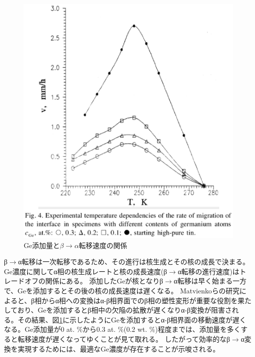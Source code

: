 \begin{figure}[!h]
\begin{minipage}{0.6\hsize}
\begin{center}
   \includegraphics[width=\hsize]{Introduction/Ge_content.eps}
  \end{center}
  \caption{Ge添加量と$\beta \to \alpha$転移速度の関係\cite{Matvienko}}
  \label{fig:Ge_content}
   \end{minipage}
\end{figure}
\clearpage

β$\to$α転移は一次転移であるため、その進行は核生成とその核の成長で決まる。Ge濃度に関してα相の核生成レートと核の成長速度(β$\to$α転移の進行速度)はトレードオフの関係にある。
添加したGeが核となりβ$\to$α転移は早く始まる\cite{Zeng2014}一方で、Geを添加するとその後の核の成長速度は遅くなる\cite{Matvienko,Zeng2014}。
Matvienkoらの研究\cite{Matvienko}によると、β相からα相への変換はα-β相界面でのβ相の塑性変形が重要な役割を果たしており、Geを添加するとβ相中の欠陥の拡散が遅くなりα-β変換が阻害される。その結果、図\ref{fig:Ge_content}に示したようにGeを添加するとα-β相界面の移動速度が遅くなる\cite{Matvienko}。Ge添加量が0 at. \%から0.3 at. \%(0.2 wt. \%)程度までは、添加量を多くすると転移速度が遅くなってゆくことが見て取れる。
したがって効率的なβ$\to$α変換を実現するためには、最適なGe濃度が存在することが示唆される。


